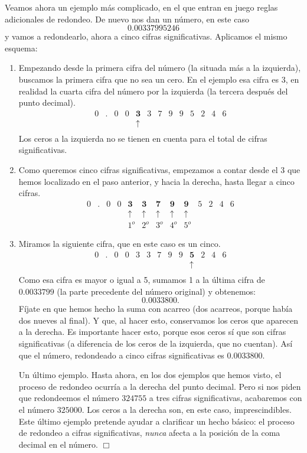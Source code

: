 \begin{Ejemplo}
  Veamos ahora un ejemplo más complicado, en el que entran en juego reglas adicionales de redondeo. De nuevo nos dan un número, en este caso
  \[0.00337995246\]
  y vamos a redondearlo, ahora a cinco cifras significativas. Aplicamos el mismo esquema:
  \begin{enumerate}
  \item Empezando desde la primera cifra del número (la situada más a la izquierda), buscamos la primera cifra que no sea un cero. En el ejemplo esa cifra es $3$, en realidad la cuarta cifra del número por la izquierda (la tercera después del punto decimal).
  \[
    \begin{array}{cccccccccccccc}
      0&.&0&0&\mathbf{3}&3&7&9&9&5&2&4&6\\
      &&&&\mathbf{\uparrow}\\
    \end{array}
  \]
  Los ceros a la izquierda no se tienen en cuenta para el total de cifras significativas.
  \item Como queremos cinco cifras significativas, empezamos a contar desde el 3 que hemos localizado en el paso anterior, y  hacia la derecha, hasta llegar a  cinco cifras.
  \[
    \begin{array}{cccccccccccccc}
      0&.&0&0&\mathbf{3}&\mathbf{3}&\mathbf{7}&\mathbf{9}&\mathbf{9}&5&2&4&6\\
      &&&&\mathbf{\uparrow}&\mathbf{\uparrow}&\mathbf{\uparrow}&\mathbf{\uparrow}&\mathbf{\uparrow}\\
      &&&&1^o&2^o&3^o&4^o&5^o
    \end{array}
  \]
  \item Miramos la siguiente cifra, que en este caso es un cinco.
  \[
    \begin{array}{cccccccccccccc}
      0&.&0&0&{3}&{3}&{7}&{9}&{9}&\mathbf{5}&2&4&6\\
      &&&&&&&&&\mathbf{\uparrow}\\
    \end{array}
  \]
  Como esa cifra es mayor o igual a 5,  sumamos 1 a la última cifra de $0.0033799$ (la parte precedente del número original) y obtenemos:
  \[0.0033800.\]
  Fíjate en que hemos hecho la suma con acarreo (dos acarreos, porque había dos nueves al final). Y que, al hacer esto, conservamos los ceros que aparecen a la derecha. Es importante hacer esto, porque esos ceros sí que son cifras significativas (a diferencia de los ceros de la izquierda, que no cuentan).
  Así que el número, redondeado a cinco cifras significativas es $0.0033800$.

  Un último ejemplo. Hasta ahora, en los dos ejemplos que hemos visto, el proceso de redondeo ocurría a la derecha del punto decimal. Pero si nos
  piden que redondeemos el número $324755$ a tres cifras significativas, acabaremos con el número $325000$. Los ceros a la derecha son, en este caso,
  imprescindibles. Este último ejemplo pretende ayudar a clarificar un hecho básico: el proceso de redondeo a cifras significativas, {\em nunca} afecta a la
  posición de la coma decimal en el número.  \flushright$\Box$
\end{enumerate}
\end{Ejemplo}

